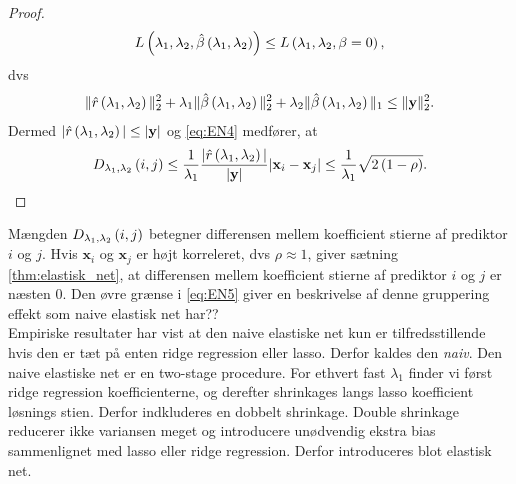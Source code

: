 \begin{proof}
\begin{align*}
L \del{\lambda_1,\lambda_2, \hat{\beta}\del{\lambda_1, \lambda_2}} \leq L \del{\lambda_1,\lambda_2, \beta = 0},  
\end{align*}
dvs
\begin{align*}
\Vert \hat{r} \del{\lambda_1, \lambda_2} \Vert_2^2 + \lambda_1 \Vert \hat{\beta} \del{\lambda_1, \lambda_2} \Vert_2^2 + \lambda_2 \Vert \hat{\beta} \del{\lambda_1, \lambda_2} \Vert_1 \leq \Vert \y \Vert_2^2.  
\end{align*}
Dermed \(\vert \hat{r} \del{\lambda_1, \lambda_2} \vert \leq \vert \y \vert\) og \eqref{eq:EN4} medfører, at
\begin{align*}
D_{\lambda_1, \lambda_2} \del{i,j} \leq \frac{1}{\lambda_1} \frac{\vert \hat{r} \del{\lambda_1, \lambda_2} \vert}{\vert \y \vert} \vert \mathbf{x}_i - \mathbf{x}_j \vert  \leq \frac{1}{\lambda_1} \sqrt{2 \del{1-\rho}}.
\end{align*}
\end{proof}
Mængden \(D_{\lambda_1, \lambda_2} \del{i,j}\) betegner differensen mellem koefficient stierne af prediktor \(i\) og \(j\).
Hvis \(\mathbf{x}_i\) og \(\mathbf{x}_j\) er højt korreleret, dvs \(\rho \approx 1\), giver sætning \ref{thm:elastisk_net}, at differensen mellem koefficient stierne af prediktor \(i\) og \(j\) er næsten 0.
Den øvre grænse i \eqref{eq:EN5} giver en beskrivelse af denne gruppering effekt som naive elastisk net har??\\[4mm]
%
Empiriske resultater har vist at den naive elastiske net kun er tilfredsstillende hvis den er tæt på enten ridge regression eller lasso.
Derfor kaldes den \textit{naiv}.
Den naive elastiske net er en two-stage procedure. For ethvert fast \(\lambda_1\) finder vi først ridge regression koefficienterne, og derefter shrinkages langs lasso koefficient løsnings stien. Derfor indkluderes en dobbelt shrinkage.
Double shrinkage reducerer ikke variansen meget og introducere unødvendig ekstra bias sammenlignet med lasso eller ridge regression.
Derfor introduceres blot elastisk net.

